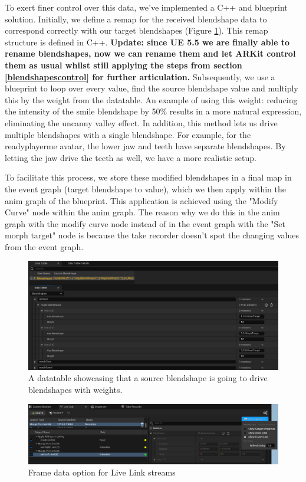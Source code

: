 \documentclass{uva-inf-article}
\begin{document}
To exert finer control over this data, we've implemented a C++ and blueprint solution. Initially, we define a remap for the received blendshape data to correspond correctly with our target blendshapes (Figure \ref{fig:datatablesnippet}). This remap structure is defined in C++. \textbf{Update: since UE 5.5 we are finally able to rename blendshapes, now we can rename them and let ARKit control them as usual whilst still applying the steps from section \ref{blendshapescontrol} for further articulation.} Subsequently, we use a blueprint to loop over every value, find the source blendshape value and multiply this by the weight from the datatable. An example of using this weight: reducing the intensity of the smile blendshape by 50\% results in a more natural expression, eliminating the uncanny valley effect.
In addition, this method lets us drive multiple blendshapes with a single blendshape. For example, for the readyplayerme avatar, the lower jaw and teeth have separate blendshapes. By letting the jaw drive the teeth as well, we have a more realistic setup.

To facilitate this process, we store these modified blendshapes in a final map in the event graph (target blendshape to value), which we then apply within the anim graph of the blueprint. This application is achieved using the "Modify Curve" node within the anim graph. The reason why we do this in the anim graph with the modify curve node instead of in the event graph with the "Set morph target" node is because the take recorder doesn't spot the changing values from the event graph.

\begin{figure}[hbt!]
    \centering
    \includegraphics[width=\textwidth]{imgs/blendshapeRemapSnippet.png}
    \caption{A datatable showcasing that a source blendshape is going to drive blendshapes with weights.}
    \label{fig:datatablesnippet}
\end{figure}


\begin{figure}[hbt!]
    \centering
    \includegraphics[width=\textwidth]{imgs/livelinkoptions.png}
    \caption{Frame data option for Live Link streams}
    \label{fig:livelinkoptions}
\end{figure}
\end{document}

